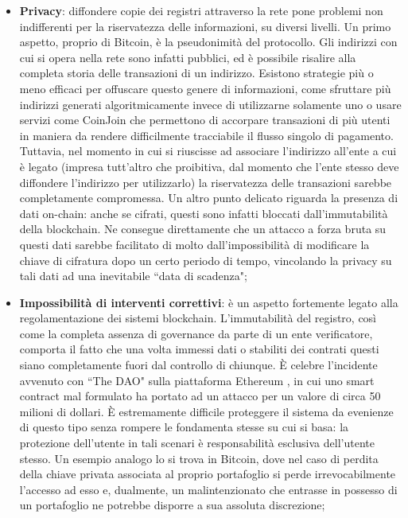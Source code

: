 \begin{itemize}
				\item \textbf{Privacy}: diffondere copie dei registri attraverso la rete pone problemi non indifferenti per la riservatezza delle informazioni, su diversi livelli. Un primo aspetto, proprio di Bitcoin, è la pseudonimità del protocollo. Gli indirizzi con cui si opera nella rete sono infatti pubblici, ed è possibile risalire alla completa storia delle transazioni di un indirizzo. Esistono strategie più o meno efficaci per offuscare questo genere di informazioni, come sfruttare più indirizzi generati algoritmicamente invece di utilizzarne solamente uno o usare servizi come CoinJoin che permettono di accorpare transazioni di più utenti in maniera da rendere difficilmente tracciabile il flusso singolo di pagamento. Tuttavia, nel momento in cui si riuscisse ad associare l'indirizzo all'ente a cui è legato (impresa tutt'altro che proibitiva, dal momento che l'ente stesso deve diffondere l'indirizzo per utilizzarlo) la riservatezza delle transazioni sarebbe completamente compromessa. Un altro punto delicato riguarda la presenza di dati on-chain: anche se cifrati, questi sono infatti bloccati dall'immutabilità della blockchain. Ne consegue direttamente che un attacco a forza bruta su questi dati sarebbe facilitato di molto dall'impossibilità di modificare la chiave di cifratura dopo un certo periodo di tempo, vincolando la privacy su tali dati ad una inevitabile ``data di scadenza"; 
				\item \textbf{Impossibilità di interventi correttivi}: è un aspetto fortemente legato alla regolamentazione dei sistemi blockchain. L'immutabilità del registro, così come la completa assenza di governance da parte di un ente verificatore, comporta il fatto che una volta immessi dati o stabiliti dei contrati questi siano completamente fuori dal controllo di chiunque. È celebre l'incidente avvenuto con ``The DAO" sulla piattaforma Ethereum \cite{theDAO}, in cui uno smart contract mal formulato ha portato ad un attacco per un valore di circa 50 milioni di dollari. È estremamente difficile proteggere il sistema da evenienze di questo tipo senza rompere le fondamenta stesse su cui si basa: la protezione dell'utente in tali scenari è responsabilità esclusiva dell'utente stesso. Un esempio analogo lo si trova in Bitcoin, dove nel caso di perdita della chiave privata associata al proprio portafoglio si perde irrevocabilmente l'accesso ad esso e, dualmente, un malintenzionato che entrasse in possesso di un portafoglio ne potrebbe disporre a sua assoluta discrezione;

\end{itemize}
